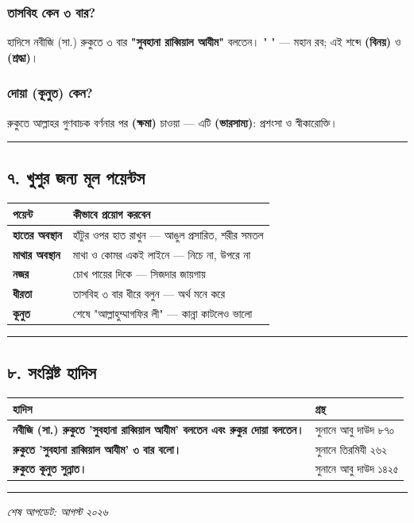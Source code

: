 \subsubsection*{\textbf{তাসবিহ কেন ৩ বার?}}
হাদিসে নবীজি (সা.) রুকুতে ৩ বার \textbf{"সুবহানা রাব্বিয়াল আযীম"} বলতেন। " " — মহান রব; এই শব্দে \textbf{ (বিনয়)} ও \textbf{ (শ্রদ্ধা)}।

\subsubsection*{\textbf{দোয়া (কূনুত) কেন?}}
রুকুতে আল্লাহর গুণবাচক বর্ণনার পর \textbf{ (ক্ষমা)} চাওয়া — এটি \textbf{ (ভারসাম্য)}: প্রশংসা ও স্বীকারোক্তি।

\medskip\hrule\medskip

\subsection*{৭. খুশুর জন্য মূল পয়েন্টস}

\begin{table}[h]\centering\small
\begin{tabular}{ll}
পয়েন্ট & কীভাবে প্রয়োগ করবেন \\
\hline
\textbf{হাতের অবস্থান} & হাঁটুর ওপর হাত রাখুন — আঙুল প্রসারিত, শরীর সমতল \\
\textbf{মাথার অবস্থান} & মাথা ও কোমর একই লাইনে — নিচে না, উপরে না \\
\textbf{নজর} & চোখ পায়ের দিকে — সিজদার জায়গায় \\
\textbf{ধীরতা} & তাসবিহ ৩ বার ধীরে বলুন — অর্থ মনে করে \\
\textbf{কূনুত} & শেষে "আল্লাহুম্মাগফির লী" — কান্না কাটলেও ভালো \\
\hline
\end{tabular}
\end{table}

\medskip\hrule\medskip

\subsection*{৮. সংশ্লিষ্ট হাদিস}

\begin{table}[h]\centering\small
\begin{tabular}{ll}
হাদিস & গ্রন্থ \\
\hline
\textbf{\lat{“}নবীজি (সা.) রুকুতে 'সুবহানা রাব্বিয়াল আযীম' বলতেন এবং রুকুর দোয়া বলতেন।\lat{”}} & সুনানে আবু দাউদ ৮৭০ \\
\textbf{\lat{“}রুকুতে 'সুবহানা রাব্বিয়াল আযীম' ৩ বার বলো।\lat{”}} & সুনানে তিরমিযী ২৬২ \\
\textbf{\lat{“}রুকুতে কূনুত সুন্নাত।\lat{”}} & সুনানে আবু দাউদ ১৪২৫ \\
\hline
\end{tabular}
\end{table}

\medskip\hrule\medskip

\textit{শেষ আপডেট: আগস্ট ২০২৬}



